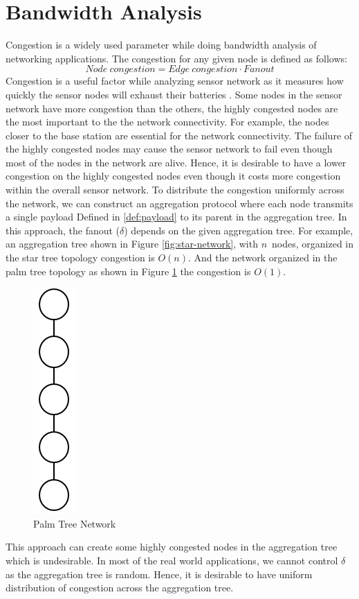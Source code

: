 \section{Bandwidth Analysis}
	Congestion is a widely used parameter while doing bandwidth analysis of networking applications.
	The congestion for any given node is defined as follows:
	\begin{equation}\label{def:congestion}
		Node\ congestion = Edge\ congestion \cdot Fanout
	\end{equation}
	Congestion is a useful factor while analyzing sensor network as it measures how quickly the sensor nodes will exhaust their batteries \cite{madden2003design}. 
	Some nodes in the sensor network have more congestion than the others, the highly congested nodes are the most important to the the network connectivity.
	For example, the nodes closer to the base station are essential for the network connectivity.
	The failure of the highly congested nodes may cause the sensor network to fail even though most of the nodes in the network are alive.
	Hence, it is desirable to have a lower congestion on the highly congested nodes even though it costs more congestion within the overall sensor network.
	To distribute the congestion uniformly across the network, we can construct an aggregation protocol where each node transmits a single payload Defined in \ref{def:payload} to its parent in the aggregation tree.
	In this approach, the fanout ($\delta$) depends on the given aggregation tree.
	For example, an aggregation tree shown in Figure \ref{fig:star-network}, with $n$\ nodes, organized in the star tree topology congestion is $O(n)$.
	And the network organized in the palm tree topology as shown in Figure \ref{fig:palm-tree-network} the congestion is $O(1)$.
	\begin{figure}[h!]
		\centering
		\includegraphics[scale = 1]{images/palm-tree.png}
		\caption{Palm Tree Network}
		\label{fig:palm-tree-network}
	\end{figure}
	This approach can create some highly congested nodes in the aggregation tree which is undesirable.
	In most of the real world applications, we cannot control $\delta$ as the aggregation tree is random.
	Hence, it is desirable to have uniform distribution of congestion across the aggregation tree.

